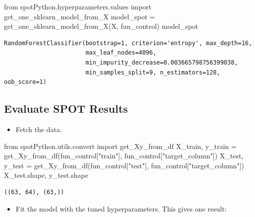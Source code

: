 \documentclass[
  letterpaper,
  DIV=11,
  numbers=noendperiod]{scrreprt}
\newenvironment{Shaded}{\begin{snugshade}}{\end{snugshade}}
\newcommand{\ImportTok}[1]{\textcolor[rgb]{0.00,0.46,0.62}{#1}}
\newcommand{\NormalTok}[1]{\textcolor[rgb]{0.00,0.23,0.31}{#1}}
\newcommand{\OperatorTok}[1]{\textcolor[rgb]{0.37,0.37,0.37}{#1}}
\newcommand{\StringTok}[1]{\textcolor[rgb]{0.13,0.47,0.30}{#1}}
\providecommand{\tightlist}{%
  \setlength{\itemsep}{0pt}\setlength{\parskip}{0pt}}\usepackage{longtable,booktabs,array}
\begin{document}
\begin{Shaded}
\begin{Highlighting}[]
\ImportTok{from}\NormalTok{ spotPython.hyperparameters.values }\ImportTok{import}\NormalTok{ get\_one\_sklearn\_model\_from\_X}
\NormalTok{model\_spot }\OperatorTok{=}\NormalTok{ get\_one\_sklearn\_model\_from\_X(X, fun\_control)}
\NormalTok{model\_spot}
\end{Highlighting}
\end{Shaded}

\begin{verbatim}
RandomForestClassifier(bootstrap=1, criterion='entropy', max_depth=16,
                       max_leaf_nodes=4096,
                       min_impurity_decrease=0.003665798756399038,
                       min_samples_split=9, n_estimators=128, oob_score=1)
\end{verbatim}

\hypertarget{evaluate-spot-results}{%
\subsection{Evaluate SPOT Results}\label{evaluate-spot-results}}

\begin{itemize}
\tightlist
\item
  Fetch the data.
\end{itemize}

\begin{Shaded}
\begin{Highlighting}[]
\ImportTok{from}\NormalTok{ spotPython.utils.convert }\ImportTok{import}\NormalTok{ get\_Xy\_from\_df}
\NormalTok{X\_train, y\_train }\OperatorTok{=}\NormalTok{ get\_Xy\_from\_df(fun\_control[}\StringTok{"train"}\NormalTok{], fun\_control[}\StringTok{"target\_column"}\NormalTok{])}
\NormalTok{X\_test, y\_test }\OperatorTok{=}\NormalTok{ get\_Xy\_from\_df(fun\_control[}\StringTok{"test"}\NormalTok{], fun\_control[}\StringTok{"target\_column"}\NormalTok{])}
\NormalTok{X\_test.shape, y\_test.shape}
\end{Highlighting}
\end{Shaded}

\begin{verbatim}
((63, 64), (63,))
\end{verbatim}

\begin{itemize}
\tightlist
\item
  Fit the model with the tuned hyperparameters. This gives one result:
\end{itemize}
\end{document}
